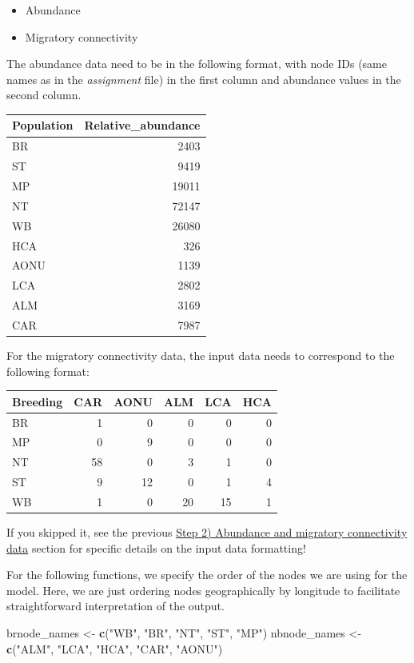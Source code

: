 \documentclass[
]{book}
\newenvironment{Shaded}{\begin{snugshade}}{\end{snugshade}}
\newcommand{\FunctionTok}[1]{\textcolor[rgb]{0.13,0.29,0.53}{\textbf{#1}}}
\newcommand{\NormalTok}[1]{#1}
\newcommand{\OtherTok}[1]{\textcolor[rgb]{0.56,0.35,0.01}{#1}}
\newcommand{\StringTok}[1]{\textcolor[rgb]{0.31,0.60,0.02}{#1}}
\providecommand{\tightlist}{%
  \setlength{\itemsep}{0pt}\setlength{\parskip}{0pt}}
\begin{document}
\begin{itemize}
\tightlist
\item
  Abundance
\item
  Migratory connectivity
\end{itemize}

The abundance data need to be in the following format, with node IDs (same names as in the \emph{assignment} file) in the first column and abundance values in the second column.

\begin{tabular}{l|r}
\hline
Population & Relative\_abundance\\
\hline
BR & 2403\\
\hline
ST & 9419\\
\hline
MP & 19011\\
\hline
NT & 72147\\
\hline
WB & 26080\\
\hline
HCA & 326\\
\hline
AONU & 1139\\
\hline
LCA & 2802\\
\hline
ALM & 3169\\
\hline
CAR & 7987\\
\hline
\end{tabular}

For the migratory connectivity data, the input data needs to correspond to the following format:

\begin{tabular}{l|r|r|r|r|r}
\hline
Breeding & CAR & AONU & ALM & LCA & HCA\\
\hline
BR & 1 & 0 & 0 & 0 & 0\\
\hline
MP & 0 & 9 & 0 & 0 & 0\\
\hline
NT & 58 & 0 & 3 & 1 & 0\\
\hline
ST & 9 & 12 & 0 & 1 & 4\\
\hline
WB & 1 & 0 & 20 & 15 & 1\\
\hline
\end{tabular}

If you skipped it, see the previous \protect\hyperlink{data}{Step 2) Abundance and migratory connectivity data} section for specific details on the input data formatting!

For the following functions, we specify the order of the nodes we are using for the model. Here, we are just ordering nodes geographically by longitude to facilitate straightforward interpretation of the output.

\begin{Shaded}
\begin{Highlighting}[]
\NormalTok{brnode\_names }\OtherTok{\textless{}{-}} \FunctionTok{c}\NormalTok{(}\StringTok{"WB"}\NormalTok{, }\StringTok{"BR"}\NormalTok{, }\StringTok{"NT"}\NormalTok{, }\StringTok{"ST"}\NormalTok{, }\StringTok{"MP"}\NormalTok{)}
\NormalTok{nbnode\_names }\OtherTok{\textless{}{-}} \FunctionTok{c}\NormalTok{(}\StringTok{"ALM"}\NormalTok{, }\StringTok{"LCA"}\NormalTok{, }\StringTok{"HCA"}\NormalTok{, }\StringTok{"CAR"}\NormalTok{, }\StringTok{"AONU"}\NormalTok{)}
\end{Highlighting}
\end{Shaded}
\end{document}
